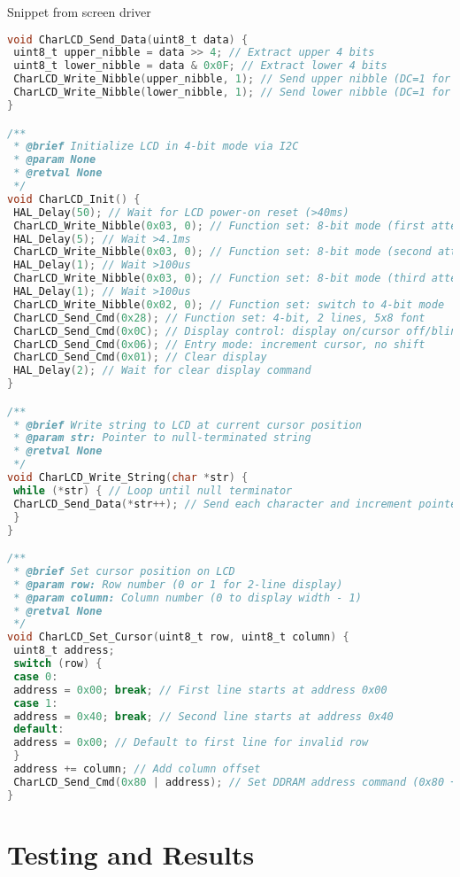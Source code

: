 \documentclass[12pt]{article}
\begin{document}
\vspace{1em}

\text Snippet from screen driver
\begin{lstlisting}[language=C]
void CharLCD_Send_Data(uint8_t data) {
 uint8_t upper_nibble = data >> 4; // Extract upper 4 bits
 uint8_t lower_nibble = data & 0x0F; // Extract lower 4 bits
 CharLCD_Write_Nibble(upper_nibble, 1); // Send upper nibble (DC=1 for data)
 CharLCD_Write_Nibble(lower_nibble, 1); // Send lower nibble (DC=1 for data)
}

/**
 * @brief Initialize LCD in 4-bit mode via I2C
 * @param None
 * @retval None
 */
void CharLCD_Init() {
 HAL_Delay(50); // Wait for LCD power-on reset (>40ms)
 CharLCD_Write_Nibble(0x03, 0); // Function set: 8-bit mode (first attempt)
 HAL_Delay(5); // Wait >4.1ms
 CharLCD_Write_Nibble(0x03, 0); // Function set: 8-bit mode (second attempt)
 HAL_Delay(1); // Wait >100us
 CharLCD_Write_Nibble(0x03, 0); // Function set: 8-bit mode (third attempt)
 HAL_Delay(1); // Wait >100us
 CharLCD_Write_Nibble(0x02, 0); // Function set: switch to 4-bit mode
 CharLCD_Send_Cmd(0x28); // Function set: 4-bit, 2 lines, 5x8 font
 CharLCD_Send_Cmd(0x0C); // Display control: display on/cursor off/blink off
 CharLCD_Send_Cmd(0x06); // Entry mode: increment cursor, no shift
 CharLCD_Send_Cmd(0x01); // Clear display
 HAL_Delay(2); // Wait for clear display command
}

/**
 * @brief Write string to LCD at current cursor position
 * @param str: Pointer to null-terminated string
 * @retval None
 */
void CharLCD_Write_String(char *str) {
 while (*str) { // Loop until null terminator
 CharLCD_Send_Data(*str++); // Send each character and increment pointer
 }
}

/**
 * @brief Set cursor position on LCD
 * @param row: Row number (0 or 1 for 2-line display)
 * @param column: Column number (0 to display width - 1)
 * @retval None
 */
void CharLCD_Set_Cursor(uint8_t row, uint8_t column) {
 uint8_t address;
 switch (row) {
 case 0:
 address = 0x00; break; // First line starts at address 0x00
 case 1:
 address = 0x40; break; // Second line starts at address 0x40
 default:
 address = 0x00; // Default to first line for invalid row
 }
 address += column; // Add column offset
 CharLCD_Send_Cmd(0x80 | address); // Set DDRAM address command (0x80 + address)
}
\end{lstlisting}




\section{Testing and Results}
\end{document}
